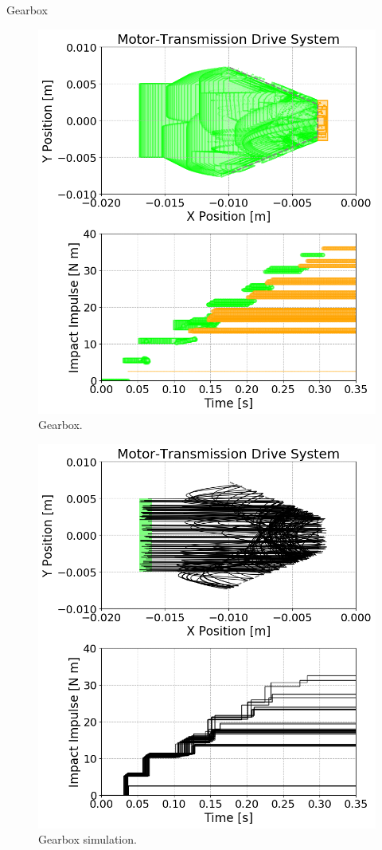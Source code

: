 Gearbox~\cite{chen2014motor}


\begin{figure}[t]
\centerline{\includegraphics[width=0.8\columnwidth]{images/gearbox.png}}
\caption{Gearbox.}
\label{fig:chaser}
\end{figure}

\begin{figure}[t]
\centerline{\includegraphics[width=0.8\columnwidth]{images/gearbox_sim.png}}
\caption{Gearbox simulation.}
\label{fig:chaser}
\end{figure}

